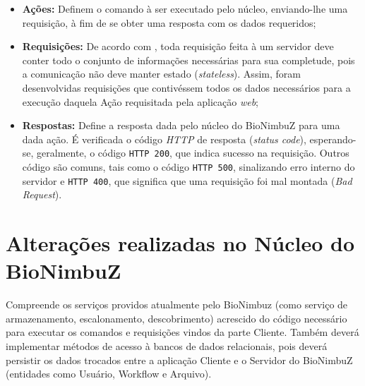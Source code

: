 \begin{itemize}
	\item \textbf{Ações:} Definem o comando à ser executado pelo núcleo, enviando-lhe uma requisição, à fim de se obter uma resposta com os dados requeridos;
	\item \textbf{Requisições:} De acordo com \cite{rest}, toda requisição feita à um servidor deve conter todo o conjunto de informações necessárias para sua completude, pois a comunicação não deve manter estado (\textit{stateless}). Assim, foram desenvolvidas requisições que contivéssem todos os dados necessários para a execução daquela Ação requisitada pela aplicação \textit{web};
	\item \textbf{Respostas:} Define a resposta dada pelo núcleo do BioNimbuZ para uma dada ação. É verificada o código \textit{HTTP} de resposta (\textit{status code}), esperando-se, geralmente, o código \texttt{HTTP 200}, que indica sucesso na requisição. Outros código são comuns, tais como o código \texttt{HTTP 500}, sinalizando erro interno do servidor e \texttt{HTTP 400}, que significa que uma requisição foi mal montada (\textit{Bad Request}).
\end{itemize}


\section{Alterações realizadas no Núcleo do BioNimbuZ} \label{cap5sec5}
    
Compreende os serviços providos atualmente pelo BioNimbuz (como serviço de armazenamento, escalonamento, descobrimento) acrescido do código necessário para executar os comandos e requisições vindos da parte Cliente. Também deverá implementar métodos de acesso à bancos de dados relacionais, pois deverá persistir os dados trocados entre a aplicação Cliente e o Servidor do BioNimbuZ (entidades como Usuário, Workflow e Arquivo).

%



